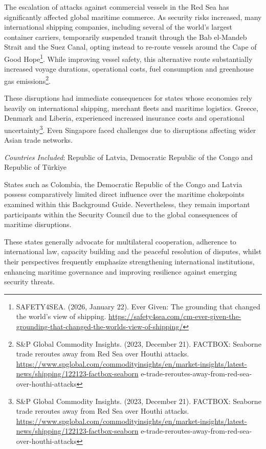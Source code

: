 The escalation of attacks against commercial vessels in the Red Sea has significantly affected global maritime commerce. As security risks increased, many international shipping companies, including several of the world's largest container carriers, temporarily suspended transit through the Bab el-Mandeb Strait and the Suez Canal, opting instead to re-route vessels around the Cape of Good Hope\footnote{SAFETY4SEA. (2026, January 22). Ever Given: The grounding that changed the world's view of shipping. \url{https://safety4sea.com/cm-ever-given-the-grounding-that-changed-the-worlds-view-of-shipping/}}. While improving vessel safety, this alternative route substantially increased voyage durations, operational costs, fuel consumption and greenhouse gas emissions\footnote{S\&P Global Commodity Insights. (2023, December 21). FACTBOX: Seaborne trade reroutes away from Red Sea over Houthi attacks. \url{https://www.spglobal.com/commodityinsights/en/market-insights/latest-news/shipping/122123-factbox-seaborn} e-trade-reroutes-away-from-red-sea-over-houthi-attacks}.

These disruptions had immediate consequences for states whose economies rely heavily on international shipping, merchant fleets and maritime logistics. Greece, Denmark and Liberia, experienced increased insurance costs and operational uncertainty\footnote{S\&P Global Commodity Insights. (2023, December 21). FACTBOX: Seaborne trade reroutes away from Red Sea over Houthi attacks. \url{https://www.spglobal.com/commodityinsights/en/market-insights/latest-news/shipping/122123-factbox-seaborn} e-trade-reroutes-away-from-red-sea-over-houthi-attacks}. Even Singapore faced challenges due to disruptions affecting wider Asian trade networks.


\emph{Countries Included}: Republic of Latvia, Democratic Republic of the Congo and Republic of Türkiye

States such as Colombia, the Democratic Republic of the Congo and Latvia possess comparatively limited direct influence over the maritime chokepoints examined within this Background Guide. Nevertheless, they remain important participants within the Security Council due to the global consequences of maritime disruptions.

These states generally advocate for multilateral cooperation, adherence to international law, capacity building and the peaceful resolution of disputes, whilst their perspectives frequently emphasize strengthening international institutions, enhancing maritime governance and improving resilience against emerging security threats.

